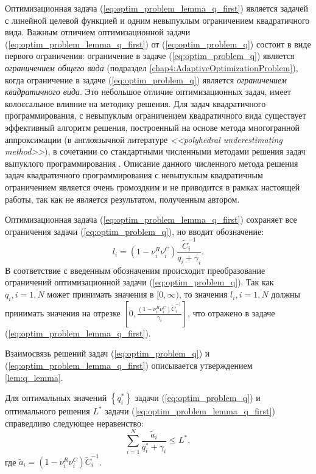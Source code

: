Оптимизационная задача (\ref{eq:optim_problem_lemma_q_first}) является задачей с линейной целевой функцией и одним невыпуклым ограничением квадратичного вида. Важным отличием оптимизационной задачи (\ref{eq:optim_problem_lemma_q_first}) от (\ref{eq:optim_problem_q}) состоит в виде первого ограничения: ограничение в задаче (\ref{eq:optim_problem_q}) является \textit{ограничением общего вида} (подраздел \ref{chap4:AdaptiveOptimizationProblem}), когда ограничение в задаче (\ref{eq:optim_problem_q}) является \textit{ограничением квадратичного вида}. Это небольшое отличие оптимизационных задач, имеет колоссальное влияние на методику решения. Для задач квадратичного программирования, с невыпуклым ограничением квадратичного вида существует эффективный алгоритм решения, построенный на основе метода многогранной аппроксимации (в англоязычной литературе \textit{<<polyhedral underestimating method>>}), в сочетании со стандартными численными методами решения задач выпуклого программирования \cite{Zheng2011}. Описание данного численного метода решения задач квадратичного программирования с невыпуклым квадратичным ограничением является очень громоздким и не приводится в рамках настоящей работы, так как не является результатом, полученным автором.

Оптимизационная задача (\ref{eq:optim_problem_lemma_q_first}) сохраняет все ограничения задачи (\ref{eq:optim_problem_q}), но вводит обозначение:
$$l_i = \left(1-\nu^R_i\nu^C_i\right)\frac{\tilde{C}^{-1}_i }{q_i + \gamma_i}.$$
В соответствие с введенным обозначеним происходит преобразование ограничений оптимизационной задачи (\ref{eq:optim_problem_q}). Так как $q_i, i = \overline{1,N}$ может принимать значения в $[0, \infty)$, то значения $l_i, i = \overline{1,N}$ должны принимать значения на отрезке $\left[0, \frac{\left(1-\nu^R_i\nu^C_i\right)\tilde{C}^{-1}_i }{\gamma_i}\right]$, что отражено в задаче (\ref{eq:optim_problem_lemma_q_first}).

Взаимосвязь решений задач (\ref{eq:optim_problem_q}) и (\ref{eq:optim_problem_lemma_q_first}) описывается утверждением \ref{lem:q_lemma}.

\begin{lemma}
\label{lem:q_lemma}
Для оптимальных значений $\left\{q^{*}_i\right\}$ задачи (\ref{eq:optim_problem_q}) и оптимального решения $L^{*}$ задачи (\ref{eq:optim_problem_lemma_q_first}) справедливо следующее неравенство:
$$\sum\limits_{i=1}^{N} {\frac{\tilde{a}_i}{q^{*}_i + \gamma_i}} \leq L^{*},$$
где $\tilde{a}_i = \left(1-\nu^R_i\nu^C_i\right)\tilde{C}^{-1}_i$.
\end{lemma}

